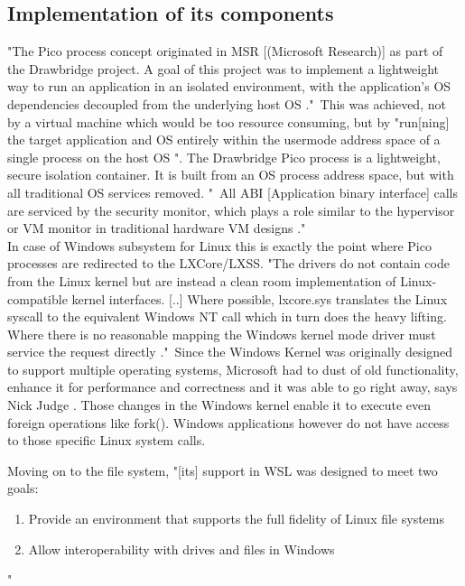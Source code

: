 \documentclass[utf8,biblatex, ngerman, english]{lni}
\begin{document}
\subsection{Implementation of its components}

"The Pico process concept originated in MSR [(Microsoft Research)] as part of the Drawbridge project. A goal of this project was to implement a lightweight way to run an application in an isolated environment, with the application’s OS dependencies decoupled from the underlying host OS \cite{Ha16a}."\ This was achieved, not by a virtual machine which would be too resource consuming, but by "run[ning] the target application and OS entirely within the usermode address space of a single process on the host OS \cite{Ha16a}". The Drawbridge Pico process is a lightweight, secure isolation container. It is built from an OS process address space, but with all traditional OS services removed. "\ All ABI [Application binary interface] calls are serviced by the security monitor, which plays a role similar to the hypervisor or VM monitor in traditional hardware VM designs \cite{11}."\\
In case of Windows subsystem for Linux this is exactly the point where Pico processes are redirected to the LXCore/LXSS. "The drivers do not contain code from the Linux kernel but are instead a clean room implementation of Linux-compatible kernel interfaces. [..] Where possible, lxcore.sys translates the Linux syscall to the equivalent Windows NT call which in turn does the heavy lifting. Where there is no reasonable mapping the Windows kernel mode driver must service the request directly \cite{Ha16b}."\ Since the Windows Kernel was originally designed to support multiple operating systems, Microsoft had to dust of old functionality, enhance it for performance and correctness and it was able to go right away, says Nick Judge \cite{Ha16a}. Those changes in the Windows kernel enable it to execute even foreign operations like fork(). Windows applications however do not have access to those specific Linux system calls.

Moving on to the file system, "[its] support in WSL was designed to meet two goals:
\begin{enumerate}
    \item Provide an environment that supports the full fidelity of Linux file systems
    \item Allow interoperability with drives and files in Windows 
\end{enumerate} \cite{Ha16b}"
\end{document}
